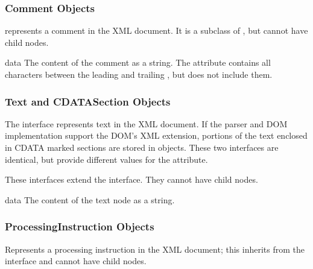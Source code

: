 \subsubsection{Comment Objects \label{dom-comment-objects}}

 represents a comment in the XML document.  It is a
subclass of , but cannot have child nodes.

\begin{memberdesc}[Comment]{data}
The content of the comment as a string.  The attribute contains all
characters between the leading \code{<!-}\code{-} and trailing
\code{-}\code{->}, but does not include them.
\end{memberdesc}


\subsubsection{Text and CDATASection Objects \label{dom-text-objects}}

The  interface represents text in the XML document.  If
the parser and DOM implementation support the DOM's XML extension,
portions of the text enclosed in CDATA marked sections are stored in
 objects.  These two interfaces are identical, but
provide different values for the  attribute.

These interfaces extend the  interface.  They cannot have
child nodes.

\begin{memberdesc}[Text]{data}
The content of the text node as a string.
\end{memberdesc}



\subsubsection{ProcessingInstruction Objects \label{dom-pi-objects}}

Represents a processing instruction in the XML document; this inherits
from the  interface and cannot have child nodes.

